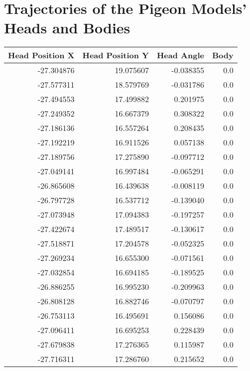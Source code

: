 \section{Trajectories of the Pigeon Models' Heads and Bodies}

\begin{tabular}{rrrr}
\toprule
 Head Position X &  Head Position Y &  Head Angle &  Body \\
\midrule
      -27.304876 &        19.075607 &   -0.038355 &   0.0 \\
      -27.577311 &        18.579769 &   -0.031786 &   0.0 \\
      -27.494553 &        17.499882 &    0.201975 &   0.0 \\
      -27.249352 &        16.667379 &    0.308322 &   0.0 \\
      -27.186136 &        16.557264 &    0.208435 &   0.0 \\
      -27.192219 &        16.911526 &    0.057138 &   0.0 \\
      -27.189756 &        17.275890 &   -0.097712 &   0.0 \\
      -27.049141 &        16.997484 &   -0.065291 &   0.0 \\
      -26.865608 &        16.439638 &   -0.008119 &   0.0 \\
      -26.797728 &        16.537712 &   -0.139040 &   0.0 \\
      -27.073948 &        17.094383 &   -0.197257 &   0.0 \\
      -27.422674 &        17.489517 &   -0.130617 &   0.0 \\
      -27.518871 &        17.204578 &   -0.052325 &   0.0 \\
      -27.269234 &        16.655300 &   -0.071561 &   0.0 \\
      -27.032854 &        16.694185 &   -0.189525 &   0.0 \\
      -26.886255 &        16.995230 &   -0.209963 &   0.0 \\
      -26.808128 &        16.882746 &   -0.070797 &   0.0 \\
      -26.753113 &        16.495691 &    0.156086 &   0.0 \\
      -27.096411 &        16.695253 &    0.228439 &   0.0 \\
      -27.679838 &        17.276365 &    0.115987 &   0.0 \\
      -27.716311 &        17.286760 &    0.215652 &   0.0 \\

\end{tabular}
